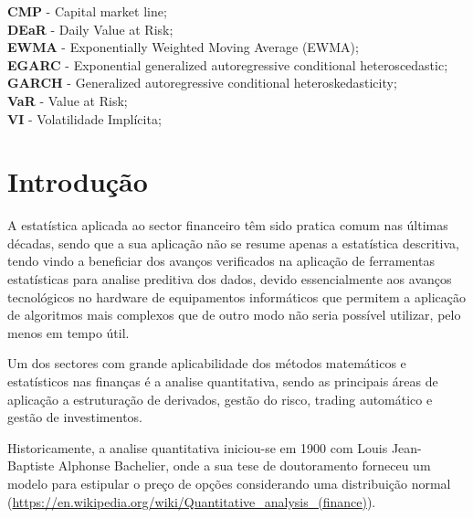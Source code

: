 \documentclass[
  12pt,
  a4paper,
  openany]{book}
\begin{document}
\textbf{CMP} - Capital market line;\\

\textbf{DEaR} - Daily Value at Risk;\\

\textbf{EWMA} - Exponentially Weighted Moving Average (EWMA);\\

\textbf{EGARC} - Exponential generalized autoregressive conditional heteroscedastic;\\

\textbf{GARCH} - Generalized autoregressive conditional heteroskedasticity;\\

\textbf{VaR} - Value at Risk;\\

\textbf{VI} - Volatilidade Implícita;\\

\mainmatter

\hypertarget{intro}{%
\chapter*{Introdução}\label{intro}}

A estatística aplicada ao sector financeiro têm sido pratica comum nas últimas décadas, sendo que a sua aplicação não se resume apenas a estatística descritiva, tendo vindo a beneficiar dos avanços verificados na aplicação de ferramentas estatísticas para analise preditiva dos dados, devido essencialmente aos avanços tecnológicos no hardware de equipamentos informáticos que permitem a aplicação de algoritmos mais complexos que de outro modo não seria possível utilizar, pelo menos em tempo útil.

Um dos sectores com grande aplicabilidade dos métodos matemáticos e estatísticos nas finanças é a analise quantitativa, sendo as principais áreas de aplicação a estruturação de derivados, gestão do risco, trading automático e gestão de investimentos.

Historicamente, a analise quantitativa iniciou-se em 1900 com Louis Jean-Baptiste Alphonse Bachelier, onde a sua tese de doutoramento forneceu um modelo para estipular o preço de opções considerando uma distribuição normal (\url{https://en.wikipedia.org/wiki/Quantitative_analysis_(finance)}).
\end{document}
